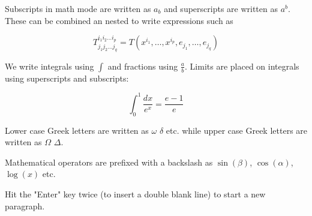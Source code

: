 \documentclass[12pt, letterpaper, twoside]{article}
\begin{document}
Subscripts in math mode are written as $a_b$ and superscripts are written as $a^b$. These can be combined an nested to write expressions such as

\[ T^{i_1 i_2 \dots i_p}_{j_1 j_2 \dots j_q} = T(x^{i_1},\dots,x^{i_p},e_{j_1},\dots,e_{j_q}) \]
 
We write integrals using $\int$ and fractions using $\frac{a}{b}$. Limits are placed on integrals using superscripts and subscripts:

\[ \int_0^1 \frac{dx}{e^x} =  \frac{e-1}{e} \]

Lower case Greek letters are written as $\omega$ $\delta$ etc. while upper case Greek letters are written as $\Omega$ $\Delta$.

Mathematical operators are prefixed with a backslash as $\sin(\beta)$, $\cos(\alpha)$, $\log(x)$ etc.


Hit the "Enter" key twice (to insert a double blank line) to start a new paragraph.
\end{document}
